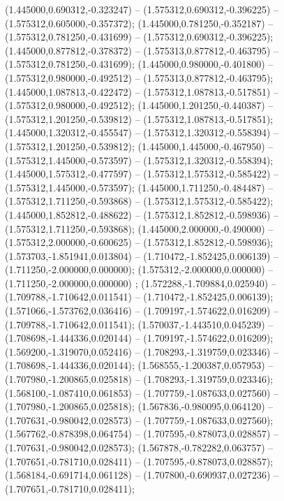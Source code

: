  (1.445000,0.690312,-0.323247) -- (1.575312,0.690312,-0.396225) -- (1.575312,0.605000,-0.357372);
 (1.445000,0.781250,-0.352187) -- (1.575312,0.781250,-0.431699) -- (1.575312,0.690312,-0.396225);
 (1.445000,0.877812,-0.378372) -- (1.575313,0.877812,-0.463795) -- (1.575312,0.781250,-0.431699);
 (1.445000,0.980000,-0.401800) -- (1.575312,0.980000,-0.492512) -- (1.575313,0.877812,-0.463795);
 (1.445000,1.087813,-0.422472) -- (1.575312,1.087813,-0.517851) -- (1.575312,0.980000,-0.492512);
 (1.445000,1.201250,-0.440387) -- (1.575312,1.201250,-0.539812) -- (1.575312,1.087813,-0.517851);
 (1.445000,1.320312,-0.455547) -- (1.575312,1.320312,-0.558394) -- (1.575312,1.201250,-0.539812);
 (1.445000,1.445000,-0.467950) -- (1.575312,1.445000,-0.573597) -- (1.575312,1.320312,-0.558394);
 (1.445000,1.575312,-0.477597) -- (1.575312,1.575312,-0.585422) -- (1.575312,1.445000,-0.573597);
 (1.445000,1.711250,-0.484487) -- (1.575312,1.711250,-0.593868) -- (1.575312,1.575312,-0.585422);
 (1.445000,1.852812,-0.488622) -- (1.575312,1.852812,-0.598936) -- (1.575312,1.711250,-0.593868);
 (1.445000,2.000000,-0.490000) -- (1.575312,2.000000,-0.600625) -- (1.575312,1.852812,-0.598936);
 (1.573703,-1.851941,0.013804) -- (1.710472,-1.852425,0.006139) -- (1.711250,-2.000000,0.000000);
 (1.575312,-2.000000,0.000000) -- (1.711250,-2.000000,0.000000) ;
 (1.572288,-1.709884,0.025940) -- (1.709788,-1.710642,0.011541) -- (1.710472,-1.852425,0.006139);
 (1.571066,-1.573762,0.036416) -- (1.709197,-1.574622,0.016209) -- (1.709788,-1.710642,0.011541);
 (1.570037,-1.443510,0.045239) -- (1.708698,-1.444336,0.020144) -- (1.709197,-1.574622,0.016209);
 (1.569200,-1.319070,0.052416) -- (1.708293,-1.319759,0.023346) -- (1.708698,-1.444336,0.020144);
 (1.568555,-1.200387,0.057953) -- (1.707980,-1.200865,0.025818) -- (1.708293,-1.319759,0.023346);
 (1.568100,-1.087410,0.061853) -- (1.707759,-1.087633,0.027560) -- (1.707980,-1.200865,0.025818);
 (1.567836,-0.980095,0.064120) -- (1.707631,-0.980042,0.028573) -- (1.707759,-1.087633,0.027560);
 (1.567762,-0.878398,0.064754) -- (1.707595,-0.878073,0.028857) -- (1.707631,-0.980042,0.028573);
 (1.567878,-0.782282,0.063757) -- (1.707651,-0.781710,0.028411) -- (1.707595,-0.878073,0.028857);
 (1.568184,-0.691714,0.061128) -- (1.707800,-0.690937,0.027236) -- (1.707651,-0.781710,0.028411);
